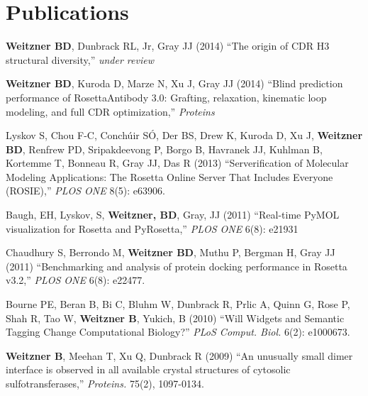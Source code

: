 \documentclass[12pt]{scrartcl}
\begin{document}
\section{\lsstyle Publications}
\noindent \textbf{Weitzner BD}, Dunbrack RL, Jr, Gray JJ (2014) ``The origin of CDR H3 structural diversity,'' \textit{under review} 

\noindent \textbf{Weitzner BD}, Kuroda D, Marze N, Xu J, Gray JJ (2014) ``Blind prediction performance of RosettaAntibody 3.0: Grafting, relaxation, kinematic loop modeling, and full CDR optimization,'' \textit{Proteins} 

\vspace{0.75\baselineskip}

\noindent Lyskov S, Chou F-C, Conch{\'u}ir S{\'O}, Der BS, Drew K, Kuroda D, Xu J, \textbf{Weitzner BD}, Renfrew PD, Sripakdeevong P, Borgo B, Havranek JJ, Kuhlman B, Kortemme T, Bonneau R, Gray JJ, Das R (2013) ``Serverification of Molecular Modeling Applications: The Rosetta Online Server That Includes Everyone (ROSIE),'' \textit{PLOS ONE} 8(5): e63906.

\vspace{0.75\baselineskip}

\noindent Baugh, EH, Lyskov, S, \textbf{Weitzner, BD}, Gray, JJ (2011) ``Real-time PyMOL visualization for Rosetta and PyRosetta,'' \textit{PLOS ONE} 6(8): e21931

\vspace{0.75\baselineskip}

\noindent Chaudhury S, Berrondo M, \textbf{Weitzner BD}, Muthu P, Bergman H, Gray JJ (2011) ``Benchmarking and analysis of protein docking performance in Rosetta v3.2,'' \textit{PLOS ONE} 6(8): e22477.

\vspace{0.75\baselineskip}

\noindent Bourne PE, Beran B, Bi C, Bluhm W, Dunbrack R, Prlic A, Quinn G, Rose P, Shah R, Tao W, \textbf{Weitzner B}, Yukich, B (2010) ``Will Widgets and Semantic Tagging Change Computational Biology?'' \textit{PLoS Comput. Biol.} 6(2): e1000673.

\vspace{0.75\baselineskip}

\noindent\textbf{Weitzner B}, Meehan T, Xu Q, Dunbrack R (2009) ``An unusually small dimer interface is observed in all available crystal structures of cytosolic sulfotransferases,'' \textit{Proteins.} 75(2), 1097-0134.
\end{document}
